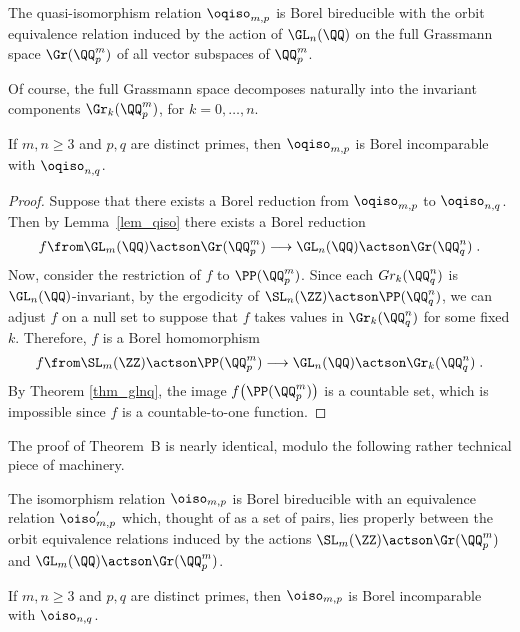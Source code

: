 \documentclass[oneside,leqno,11pt]{amsart}
\begin{document}
\begin{lem}
  \label{lem_qiso}
  The quasi-isomorphism relation $\oqiso_{m,p}$ is Borel bireducible
  with the orbit equivalence relation induced by the action of
  $\GL_n(\QQ)$ on the full Grassmann space $\Gr(\QQ_p^m)$ of all
  vector subspaces of $\QQ_p^m$.
\end{lem}

Of course, the full Grassmann space decomposes naturally into the
invariant components $\Gr_k(\QQ_p^m)$, for $k=0,\ldots,n$.

\begin{cor}[Theorem~A]
  \label{mainthmp1}
  If $m,n\geq3$ and $p,q$ are distinct primes, then $\oqiso_{m,p}$ is
  Borel incomparable with $\oqiso_{n,q}$.
\end{cor}

\begin{proof}
  Suppose that there exists a Borel reduction from $\oqiso_{m,p}$ to
  $\oqiso_{n,q}$.  Then by Lemma~\ref{lem_qiso} there exists a Borel
  reduction
  \[f\from\GL_m(\QQ)\actson\Gr(\QQ_p^m)
  \longrightarrow\GL_n(\QQ)\actson\Gr(\QQ_q^n)\;.
  \]
  Now, consider the restriction of $f$ to $\PP(\QQ_p^m)$.  Since each
  $Gr_k(\QQ_q^n)$ is $\GL_n(\QQ)$-invariant, by the ergodicity of
  $\SL_n(\ZZ)\actson\PP(\QQ_q^n)$, we can adjust $f$ on a null set to
  suppose that $f$ takes values in $\Gr_k(\QQ_q^n)$ for some fixed
  $k$.  Therefore, $f$ is a Borel homomorphism
  \[f\from\SL_m(\ZZ)\actson\PP(\QQ_p^m)\longrightarrow
  \GL_n(\QQ)\actson\Gr_k(\QQ_q^n)\;.
  \]
  By Theorem \ref{thm_glnq}, the image $f\!\left(\PP(\QQ_p^m)\right)$
  is a countable set, which is impossible since $f$ is a
  countable-to-one function.
\end{proof}

The proof of Theorem~B is nearly identical, modulo the following
rather technical piece of machinery.

\begin{lem}
  \label{lem_iso}
  The isomorphism relation $\oiso_{m,p}$ is Borel bireducible with an
  equivalence relation $\oiso_{m,p}'$ which, thought of as a set of
  pairs, lies properly between the orbit equivalence relations induced
  by the actions $\SL_m(\ZZ)\actson\Gr(\QQ_p^m)$ and
  $\GL_m(\QQ)\actson\Gr(\QQ_p^m)$.
\end{lem}

\begin{cor}[Theorem~B]
  \label{mainthmp2}
  If $m,n\geq3$ and $p,q$ are distinct primes, then $\oiso_{m,p}$ is
  Borel incomparable with $\oiso_{n,q}$.
\end{cor}
\end{document}
